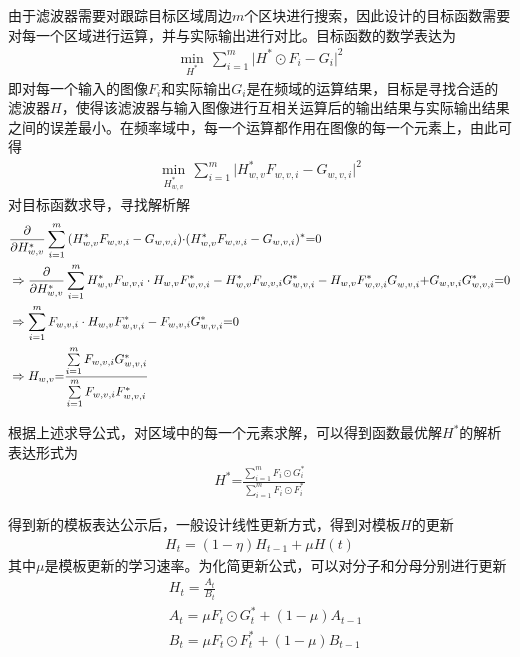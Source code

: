 由于滤波器需要对跟踪目标区域周边$m$个区块进行搜索，因此设计的目标函数需要对每一个区域进行运算，并与实际输出进行对比。目标函数的数学表达为
\begin{align}
\underset{{{H}^{*}}}{\mathop{\min }}\,\sum\limits_{i=1}^{m}{|{{H}^{*}}\odot{{F}_{i}}-{{G}_{i}}{{|}^{2}}} 
\end{align}
即对每一个输入的图像$F_i$和实际输出$G_i$是在频域的运算结果，目标是寻找合适的滤波器$H$，使得该滤波器与输入图像进行互相关运算后的输出结果与实际输出结果之间的误差最小。在频率域中，每一个运算都作用在图像的每一个元素上，由此可得
\begin{align}
\underset{H_{w,v}^{*}}{\mathop{\min }}\,\sum\limits_{i=1}^{m}{|H_{w,v}^{*}{{F}_{w,v,i}}-{{G}_{w,v,i}}{{|}^{2}}} 
\end{align}
对目标函数求导，寻找解析解
\begin{align}
&\frac{\partial }{{\partial H_{w,v}^*}}\sum\limits_{i = 1}^m {(H_{w,v}^*{F_{w,v,i}} - {G_{w,v,i}}) \cdot } {(H_{w,v}^*{F_{w,v,i}} - {G_{w,v,i}})^{\rm{*}}}{\rm{ = }}0\\  &\Rightarrow \frac{\partial }{{\partial H_{w,v}^*}}\sum\limits_{i = 1}^m {H_{w,v}^*{F_{w,v,i}} \cdot {H_{w,v}}F_{w,v,i}^{\rm{*}} - H_{w,v}^*{F_{w,v,i}}G_{w,v,i}^{\rm{*}} - {H_{w,v}}F_{w,v,i}^{\rm{*}}G_{w,v,i}^{}{\rm{ + }}{G_{w,v,i}}G_{w,v,i}^{\rm{*}}} {\rm{ = }}0\\  
&\Rightarrow \sum\limits_{i = 1}^m {{F_{w,v,i}} \cdot {H_{w,v}}F_{w,v,i}^{\rm{*}} - {F_{w,v,i}}G_{w,v,i}^{\rm{*}}} {\rm{ = }}0\\  
&\Rightarrow {H_{w,v}}{\rm{ = }}\frac{{\sum\limits_{i = 1}^m {{F_{w,v,i}}G_{w,v,i}^{\rm{*}}} }}{{\sum\limits_{i = 1}^m {{F_{w,v,i}}F_{w,v,i}^{\rm{*}}} }}
\end{align}

根据上述求导公式，对区域中的每一个元素求解，可以得到函数最优解$H^*$的解析表达形式为
\begin{align}
H^*\text{=}\frac{\sum\limits_{i=1}^{m}{{{F}_{i}}\odot G_{i}^{\text{*}}}}{\sum\limits_{i=1}^{m}{{{F}_{i}}\odot F_{i}^{\text{*}}}} 
\end{align}

得到新的模板表达公示后，一般设计线性更新方式，得到对模板$H$的更新
\begin{align}
{{H}_{t}}=(1-\eta ){{H}_{t-1}}+\mu H(t) 
\end{align}
其中$\mu$是模板更新的学习速率。为化简更新公式，可以对分子和分母分别进行更新
\begin{align}
&H_t=\frac{A_t}{B_t}\\
&A_t=\mu F_t\odot G_t^*+(1-\mu)A_{t-1}\\
&B_t=\mu F_t\odot F_t^*+(1-\mu)B_{t-1}
\end{align}

